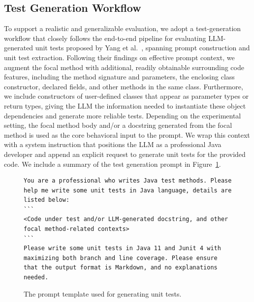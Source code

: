\documentclass[acmsmall]{acmart}
\begin{document}


\subsection{Test Generation Workflow}
\label{subsec:test_gen_workflow}
To support a realistic and generalizable evaluation, we adopt a test-generation workflow that closely follows the end-to-end pipeline for evaluating LLM-generated unit tests proposed by Yang et al.~\cite{OnLLMUTGenEvalASE2024}, spanning prompt construction and unit test extraction. Following their findings on effective prompt context, we augment the focal method with additional, readily obtainable surrounding code features, including the method signature and parameters, the enclosing class constructor, declared fields, and other methods in the same class. Furthermore, we include constructors of user-defined classes that appear as parameter types or return types, giving the LLM the information needed to instantiate these object dependencies and generate more reliable tests. Depending on the experimental setting, the focal method body and/or a docstring generated from the focal method is used as the core behavioral input to the prompt. We wrap this context with a system instruction that positions the LLM as a professional Java developer and append an explicit request to generate unit tests for the provided code. We include a summary of the test generation prompt in Figure~\ref{fig:prompt_template}.

\begin{figure}[htbp!]
\vspace{-0.8em}
\begin{minipage}{0.98\linewidth}
\begin{lstlisting}[style=promptstyle]
You are a professional who writes Java test methods. Please help me write some unit tests in Java language, details are listed below: 
```
<Code under test and/or LLM-generated docstring, and other focal method-related contexts>
```
Please write some unit tests in Java 11 and Junit 4 with maximizing both branch and line coverage. Please ensure that the output format is Markdown, and no explanations needed.
\end{lstlisting}
\end{minipage}
\vspace{-0.8em}
\caption{The prompt template used for generating unit tests.}
\vspace{-0.8em}
\label{fig:prompt_template}
\end{figure}
\end{document}
